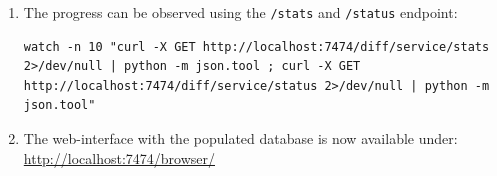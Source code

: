 \begin{enumerate}
	\item The progress can be observed using the \texttt{/stats} and \texttt{/status} endpoint:
\begin{lstlisting}
watch -n 10 "curl -X GET http://localhost:7474/diff/service/stats 2>/dev/null | python -m json.tool ; curl -X GET http://localhost:7474/diff/service/status 2>/dev/null | python -m json.tool"
\end{lstlisting}

	\item The \neoj web-interface with the populated database is now available under: \url{http://localhost:7474/browser/}
\end{enumerate}

